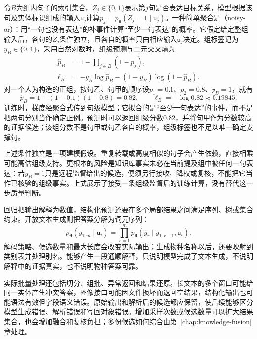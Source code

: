令$B$为组内句子的索引集合，$Z_j\in\{0,1\}$表示第$j$句是否表达目标关系，模型根据该句及实体标识组成的输入$\mathsf{u}_j$计算$p_j=p_{\bm{\theta}}(Z_j=1\mid\mathsf{u}_j)$。一种简单聚合是（noisy-or）：用“一句也没有表达”的补事件计算“至少一句表达”的概率。它假定给定整组输入后，各句的$Z_j$条件独立，且各自的概率只由相应输入$\mathsf{u}_j$决定。组标签记为$y_B\in\{0,1\}$，采用自然对数时，组级预测与二元交叉熵为
\begin{equation}
  \begin{aligned}
    \widehat p_B
    &=1-\prod_{j\in B}(1-p_j),\\
    \ell_B
    &=-y_B\log\widehat p_B
      -(1-y_B)\log(1-\widehat p_B).
  \end{aligned}
  \label{eq:knowledge-acquisition-model-bag-prediction}
\end{equation}
对一个人为构造的正组，按句乙、句甲的顺序设$p_1=0.1$、$p_2=0.8$、$y_B=1$，就有
\[
  \widehat p_B=1-(1-0.1)(1-0.8)=0.82,
  \qquad
  \ell_B=-\log0.82\approx0.19845.
\]
训练时，梯度经聚合式传到句级模型；它拟合的是“至少一句表达”的事件，而不是把两句分别当作确定正例。预测时可以返回组级分数$0.82$，并将句甲作为分数较高的证据候选；该组分数不是句甲或句乙各自的概率，组级标签也不足以唯一确定支撑句。

上述条件独立是一项建模假设。重复转载或高度相似的句子会产生依赖，直接相乘可能高估组级支持。更根本的风险是知识库事实未必在当前提及组中被任何一句表达：若$y_B=1$只是远程监督给出的候选，便须另行接收、降权或复核，不能把它当作已核验的组级事实。上式展示了接受一条组级监督后的训练计算，没有替代这一步质量判断。

回归把输出解释为数值，结构化预测还要在多个局部结果之间满足序列、树或集合约束。开放文本生成则把答案分解为词元序列：
\begin{equation}
  p_{\bm{\theta}}(y_{1:m}\mid\mathsf{u}_i)
  =
  \prod_{r=1}^{m}
  p_{\bm{\theta}}(y_r\mid y_{1:r-1},\mathsf{u}_i).
  \label{eq:knowledge-acquisition-direct-generation}
\end{equation}
解码策略、候选数量和最大长度会改变实际输出；生成物种名称以后，还要映射到类别表并处理别名。能够产生一段通顺解释，只说明模型完成了文本生成，不说明解释中的证据真实，也不说明物种答案可靠。

实际批量处理还包括切分、组批、异常返回和结果还原。长文本的多个窗口可能给同一实体产生冲突答案，图像接口可能因文件损坏而返回空结果，结构化输出也可能语法有效但字段语义错误。原始输出和解析后的候选都应保留，使后续能够区分模型生成错误、解析错误和写回对象错误。增加采样次数或候选数量可以扩大结果集合，也会增加融合和复核负担；多份候选如何综合由第~\ref{chap:knowledge-fusion}章处理。


